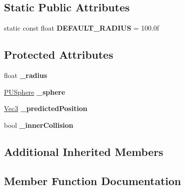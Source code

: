 \subsection*{Static Public Attributes}
\begin{DoxyCompactItemize}
\item 
\mbox{\label{classPUSphereCollider_a2c4d06fdd0bf8c0a00124e6006031477}} 
static const float {\bfseries D\+E\+F\+A\+U\+L\+T\+\_\+\+R\+A\+D\+I\+US} = 100.\+0f
\end{DoxyCompactItemize}
\subsection*{Protected Attributes}
\begin{DoxyCompactItemize}
\item 
\mbox{\label{classPUSphereCollider_acc5260009603c2e2ec496582de437b8a}} 
float {\bfseries \+\_\+radius}
\item 
\mbox{\label{classPUSphereCollider_a817c1924954658885c0dacad9a6dc158}} 
\hyperlink{classPUSphere}{P\+U\+Sphere} {\bfseries \+\_\+sphere}
\item 
\mbox{\label{classPUSphereCollider_a876a33a78cd38fd36a073120d97cb77f}} 
\hyperlink{classVec3}{Vec3} {\bfseries \+\_\+predicted\+Position}
\item 
\mbox{\label{classPUSphereCollider_a9a63d436dec1beab30b7e1af89b855f1}} 
bool {\bfseries \+\_\+inner\+Collision}
\end{DoxyCompactItemize}
\subsection*{Additional Inherited Members}


\subsection{Member Function Documentation}
\mbox{\label{classPUSphereCollider_af21786180605ce1e8ef8044caf352c35}} 
